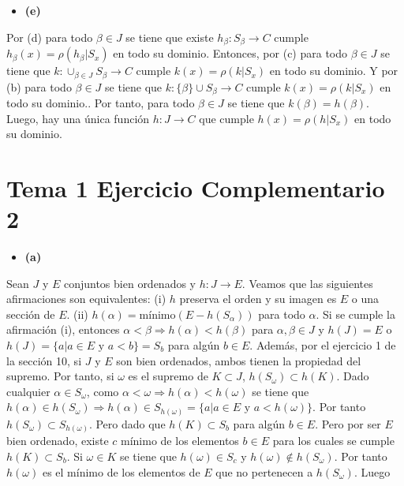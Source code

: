 \documentclass{article}
\begin{document}
\begin{itemize}
\item \bf(e)\rm
\end{itemize}
Por (d) para todo $\beta\in J$ se tiene que existe $h_{\beta}:S_{\beta}\rightarrow C$ cumple $h_\beta(x)=\rho(h_\beta|S_x)$ en todo su dominio. Entonces, por (c) para todo $\beta\in J$ se tiene que $k :\cup_{\beta\in J}S_{\beta}\rightarrow  C$ cumple $k(x)=\rho(k|S_x)$ en todo su dominio. Y por (b) para todo $\beta\in J$ se tiene que $k :\{\beta\}\cup S_{\beta}\rightarrow  C$ cumple $k(x)=\rho(k|S_x)$ en todo su dominio.. Por tanto, para todo $\beta\in J$ se tiene que $k(\beta)=h(\beta)$. Luego, hay una única función  $h:J\rightarrow C$ que cumple $h(x)=\rho(h|S_x)$ en todo su dominio.
\section{Tema 1 Ejercicio Complementario 2}
\begin{itemize}
\item \bf(a)\rm
\end{itemize}
Sean $J$ y $E$ conjuntos bien ordenados y $h:J\rightarrow E$. Veamos que las siguientes afirmaciones son equivalentes: (i) $h$ preserva el orden y su imagen es $E$ o una sección de $E$. (ii) $h(\alpha)=\text{mínimo}(E-h(S_\alpha))$ para todo $\alpha$. Si se cumple la afirmación (i), entonces $\alpha < \beta \Rightarrow h(\alpha)<h(\beta)$ para $\alpha, \beta\in J$ y $h(J)=E$ o $h(J)=\{a|a\in E \text{ y }a<b\}=S_b$ para algún $b\in E$. Además, por el ejercicio 1 de la sección 10, si $J$ y $E$ son bien ordenados, ambos tienen la propiedad del supremo. Por tanto, si $\omega$ es el supremo de $K\subset J$, $h(S_\omega)\subset h(K)$. Dado cualquier $\alpha \in S_\omega$, como $\alpha<\omega \Rightarrow h(\alpha)<h(\omega)$ se tiene que $h(\alpha)\in h(S_{\omega})\Rightarrow h(\alpha)\in S_{h(\omega)}=\{a|a\in E\text{ y }a<h(\omega)\}$. Por tanto $h(S_{\omega})\subset S_{h(\omega)}$. Pero dado que $h(K)\subset S_b$ para algún $b\in E$. Pero por ser $E$ bien ordenado, existe $c$ mínimo de los elementos $b\in E$ para los cuales se cumple $h(K)\subset S_b$. Si $\omega \in K$ se tiene que $h(\omega)\in S_c$ y $h(\omega)\notin h(S_\omega)$. Por tanto $h(\omega)$ es el mínimo de los elementos de $E$ que no pertenecen a $h(S_\omega)$. Luego 
\end{document}
